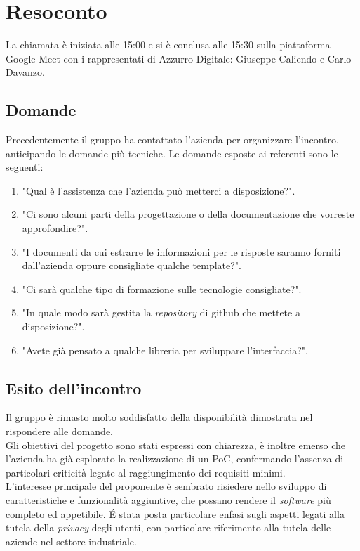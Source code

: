 \section{Resoconto}
La chiamata è iniziata alle 15:00 e si è conclusa alle 15:30 sulla piattaforma Google Meet con i rappresentati di Azzurro Digitale: Giuseppe Caliendo e Carlo Davanzo. \\

\subsection{Domande}
Precedentemente il gruppo ha contattato l'azienda per organizzare l'incontro, anticipando le domande più tecniche.
Le domande esposte ai referenti sono le seguenti:
\begin{enumerate}
	\item "Qual è l'assistenza che l'azienda può metterci a disposizione?".
	\item "Ci sono alcuni parti della progettazione o della documentazione che vorreste approfondire?".
	\item "I documenti da cui estrarre le informazioni per le risposte saranno forniti dall'azienda oppure consigliate qualche template?".
	\item "Ci sarà qualche tipo di formazione sulle tecnologie consigliate?".
	\item "In quale modo sarà gestita la \textit{repository} di github che mettete a disposizione?".
	\item "Avete già pensato a qualche libreria per sviluppare l'interfaccia?".
\end{enumerate}

\subsection{Esito dell'incontro}
Il gruppo è rimasto molto soddisfatto della disponibilità dimostrata nel rispondere alle domande. \\  
Gli obiettivi del progetto sono stati espressi con chiarezza, è inoltre emerso che l'azienda ha già esplorato la realizzazione di un PoC, confermando l'assenza di particolari criticità legate al raggiungimento dei requisiti minimi. \\
L'interesse principale del proponente è sembrato risiedere nello sviluppo di caratteristiche e funzionalità aggiuntive, che possano rendere il \textit{software} più completo ed appetibile.
\'E stata posta particolare enfasi sugli aspetti legati alla tutela della \textit{privacy} degli utenti, con particolare riferimento alla tutela delle aziende nel settore industriale.\\

